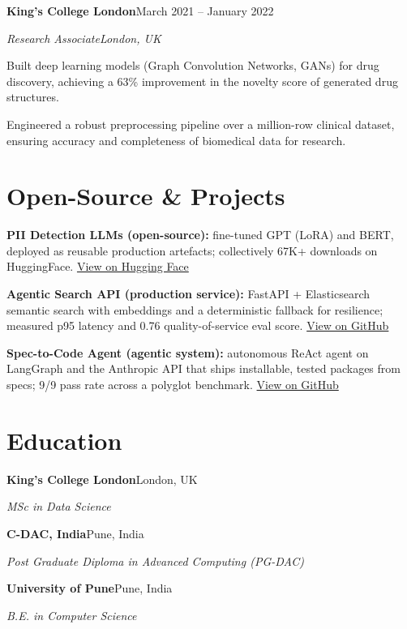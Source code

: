 \documentclass[10pt,a4paper]{article}
\newcommand{\entry}[4]{%
  {\color{company}\bfseries #1}\hfill {\color{muted}#2}\par
  \vspace{1pt}
  {\itshape #3}\hfill {\color{muted}\itshape #4}\par
  \vspace{3pt}%
}
\begin{document}
\entry{King's College London}{March 2021 -- January 2022}{Research Associate}{London, UK}
\begin{tight}
  \item Built deep learning models (Graph Convolution Networks, GANs) for drug discovery, achieving a 63\% improvement in the novelty score of generated drug structures.
  \item Engineered a robust preprocessing pipeline over a million-row clinical dataset, ensuring accuracy and completeness of biomedical data for research.
\end{tight}

\section{Open-Source \& Projects}
\begin{tight}
  \item \textbf{PII Detection LLMs (open-source):} fine-tuned GPT (LoRA) and BERT, deployed as reusable production artefacts; collectively 67K+ downloads on HuggingFace. \href{https://huggingface.co/ab-ai/pii_model}{View on Hugging Face}
  \item \textbf{Agentic Search API (production service):} FastAPI + Elasticsearch semantic search with embeddings and a deterministic fallback for resilience; measured p95 latency and 0.76 quality-of-service eval score. \href{https://github.com/abhijeetscode/search-agent}{View on GitHub}
  \item \textbf{Spec-to-Code Agent (agentic system):} autonomous ReAct agent on LangGraph and the Anthropic API that ships installable, tested packages from specs; 9/9 pass rate across a polyglot benchmark. \href{https://github.com/abhijeetscode/Spec-to-Code-Agent}{View on GitHub}
\end{tight}

\section{Education}
{\color{company}\bfseries King's College London}\hfill {\color{muted}London, UK}\par
{\itshape MSc in Data Science}\par\vspace{2pt}
{\color{company}\bfseries C-DAC, India}\hfill {\color{muted}Pune, India}\par
{\itshape Post Graduate Diploma in Advanced Computing (PG-DAC)}\par\vspace{2pt}
{\color{company}\bfseries University of Pune}\hfill {\color{muted}Pune, India}\par
{\itshape B.E. in Computer Science}\par
\end{document}
